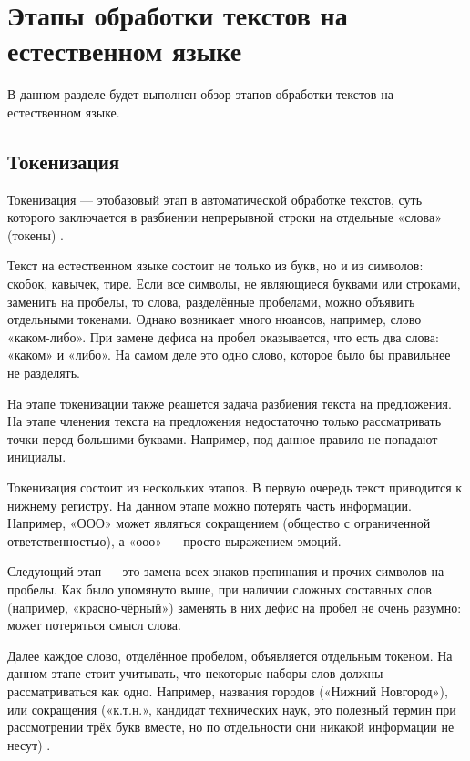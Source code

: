 \section{Этапы обработки текстов на естественном языке}

В данном разделе будет выполнен обзор этапов обработки текстов на естественном языке.

\subsection{Токенизация}

Токенизация — этобазовый этап в автоматической обработке текстов, суть которого заключается в разбиении непрерывной строки на отдельные «слова» (токены) \cite{tokenization}. 

Текст на естественном языке состоит не только из букв, но и из символов: скобок, кавычек, тире. Если все символы, не являющиеся буквами или строками, заменить на пробелы, то слова, разделённые пробелами, можно объявить отдельными токенами. Однако возникает много нюансов, например, слово «каком-либо». При замене дефиса на пробел оказывается, что есть два слова: «каком» и «либо». На самом деле это одно слово, которое было бы правильнее не разделять.

На этапе токенизации также реашется задача разбиения текста на предложения. На этапе членения текста на предложения недостаточно только рассматривать точки перед большими буквами. Например, под данное правило не попадают инициалы. 

Токенизация состоит из нескольких этапов. В первую очередь текст приводится к нижнему регистру. На данном этапе можно потерять часть информации. Например, «ООО» может являться сокращением (общество с ограниченной ответственностью), а «ооо» — просто выражением эмоций.

Следующий этап — это замена всех знаков препинания и прочих символов на пробелы. Как было упомянуто выше, при наличии сложных составных слов (например, «красно-чёрный») заменять в них дефис на пробел не очень разумно: может потеряться смысл слова. 

Далее каждое слово, отделённое пробелом, объявляется отдельным токеном. На данном этапе стоит учитывать, что некоторые наборы слов должны рассматриваться как одно. Например, названия городов («Нижний Новгород»), или сокращения («к.т.н.», кандидат технических наук, это полезный термин при рассмотрении трёх букв вместе, но по отдельности они никакой информации не несут)  \cite{tutorial}. 

